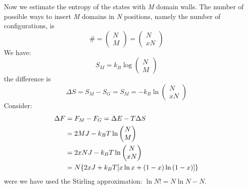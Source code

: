 \documentclass[../main/main.tex]{subfiles}
\begin{document}
Now we estimate the entropy of the states with \emph{M} domain walls.  The number of possible ways to insert \emph{M} domains in \emph{N} positions, namely the number of configurations, is
\begin{equation}
  \# = \begin{pmatrix}
  N \\
  M
  \end{pmatrix} = \begin{pmatrix}
  N \\
  xN
  \end{pmatrix}
\end{equation}
We have:
\begin{equation}
  S_M = k_B \log{\begin{pmatrix}
  N \\
  M
  \end{pmatrix}}
\end{equation}
the difference is
\begin{equation}
  \Delta S = S_M -S_G = S_M = -k_B \ln{\begin{pmatrix}
  N \\
  xN
  \end{pmatrix} }
\end{equation}
Consider:
\begin{equation}
\begin{split}
\Delta F  &= F_M - F_G = \Delta E - T \Delta S  \\
          &= 2 M J - k_B T \ln{\begin{pmatrix}
          N \\
          M
          \end{pmatrix} } \\
          & = 2xNJ - k_B T \ln{\begin{pmatrix}
          N \\
          xN
          \end{pmatrix} } \\
          & = N \qty{ 2xJ +k_B T \qty[x \ln{x} + (1-x)\ln{(1-x)}  ] }
\end{split}
\end{equation}
were we have used the Stirling approximation: \( \ln{N!} = N \ln{N} - N   \).
\end{document}
